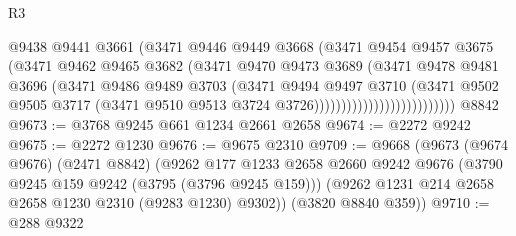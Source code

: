 \begin{lexlean}{R3}
\begin{coremodule}
                                      @9438
                                      @9441
                                      @3661
                                      (@3471
                                        @9446
                                        @9449
                                        @3668
                                        (@3471
                                          @9454
                                          @9457
                                          @3675
                                          (@3471
                                            @9462
                                            @9465
                                            @3682
                                            (@3471
                                              @9470
                                              @9473
                                              @3689
                                              (@3471
                                                @9478
                                                @9481
                                                @3696
                                                (@3471
                                                  @9486
                                                  @9489
                                                  @3703
                                                  (@3471
                                                    @9494
                                                    @9497
                                                    @3710
                                                    (@3471
                                                      @9502
                                                      @9505
                                                      @3717
                                                      (@3471
                                                        @9510
                                                        @9513
                                                        @3724
                                                        @3726))))))))))))))))))))))))))
    @8842
@9673 := @3768 @9245 @661 @1234 @2661 @2658
@9674 := @2272 @9242
@9675 := @2272 @1230
@9676 := @9675 @2310
@9709 := @9668
    (@9673
      (@9674 @9676)
      (@2471 @8842)
      (@9262
        @177
        @1233
        @2658
        @2660
        @9242
        @9676
        (@3790 @9245 @159 @9242 (@3795 (@3796 @9245 @159)))
        (@9262 @1231 @214 @2658 @2658 @1230 @2310 (@9283 @1230) @9302))
      (@3820 @8840 @359))
@9710 := @288 @9322

\end{coremodule}
\end{lexlean}
